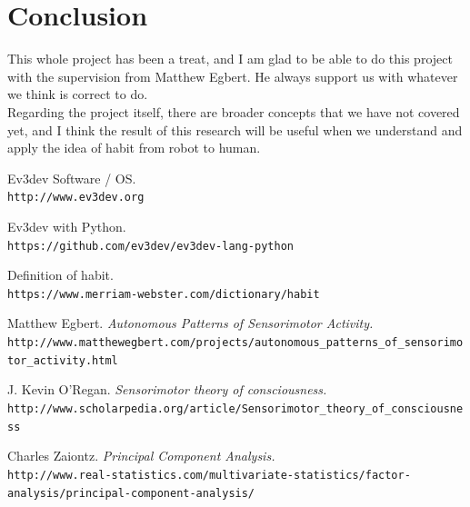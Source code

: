 \documentclass[a4paper]{article}
\begin{document}
\section{Conclusion}
This whole project has been a treat, and I am glad to be able to do this project with the supervision from Matthew Egbert. He always support us with whatever we think is correct to do.
\\\newline
Regarding the project itself, there are broader concepts that we have not covered yet, and I think the result of this research will be useful when we understand and apply the idea of habit from robot to human.

\begin{thebibliography}{9}
	Ev3dev Software / OS.
	\\\texttt{http://www.ev3dev.org} 
	
	Ev3dev with Python.
	\\\texttt{https://github.com/ev3dev/ev3dev-lang-python}
	
	Definition of habit.
	\\\texttt{https://www.merriam-webster.com/dictionary/habit}
	
	Matthew Egbert.
	\textit{Autonomous Patterns of Sensorimotor Activity.}
	\\\texttt{http://www.matthewegbert.com/projects/autonomous\_patterns\_of\_sensorimotor\_activity.html}
	
	J. Kevin O'Regan.
	\textit{Sensorimotor theory of consciousness.}
	\\\texttt{http://www.scholarpedia.org/article/Sensorimotor\_theory\_of\_consciousness}
	
	Charles Zaiontz.
	\textit{Principal Component Analysis.}
	\\\texttt{http://www.real-statistics.com/multivariate-statistics/factor-analysis/principal-component-analysis/}
	
\end{thebibliography}
\end{document}
